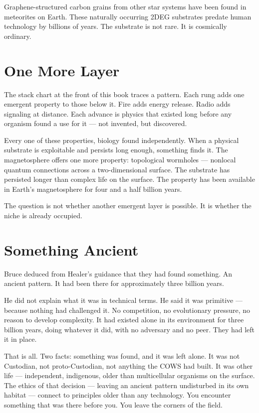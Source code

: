 Graphene-structured carbon grains from other star systems have been found in meteorites on Earth. These naturally occurring 2DEG substrates predate human technology by billions of years. The substrate is not rare. It is cosmically ordinary.

\section*{One More Layer}
\label{pos32:one-more-layer}

The stack chart at the front of this book traces a pattern. Each rung adds one emergent property to those below it. Fire adds energy release. Radio adds signaling at distance. Each advance is physics that existed long before any organism found a use for it --- not invented, but discovered.

Every one of these properties, biology found independently. When a physical substrate is exploitable and persists long enough, something finds it. The magnetosphere offers one more property: topological wormholes --- nonlocal quantum connections across a two-dimensional surface. The substrate has persisted longer than complex life on the surface. The property has been available in Earth's magnetosphere for four and a half billion years.

The question is not whether another emergent layer is possible. It is whether the niche is already occupied.


\section*{Something Ancient}
\label{pos32:something-ancient}

Bruce deduced from Healer's guidance that they had found something. An ancient pattern. It had been there for approximately three billion years.

He did not explain what it was in technical terms. He said it was primitive --- because nothing had challenged it. No competition, no evolutionary pressure, no reason to develop complexity. It had existed alone in its environment for three billion years, doing whatever it did, with no adversary and no peer. They had left it in place.

That is all. Two facts: something was found, and it was left alone. It was not Custodian, not proto-Custodian, not anything the COWS had built. It was other life --- independent, indigenous, older than multicellular organisms on the surface. The ethics of that decision --- leaving an ancient pattern undisturbed in its own habitat --- connect to principles older than any technology. You encounter something that was there before you. You leave the corners of the field.

